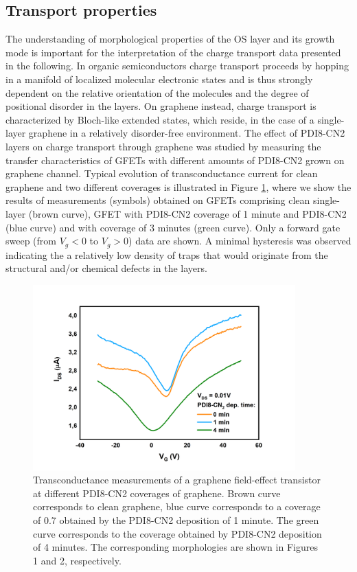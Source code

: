 \documentclass[preprint,aip,jap]{revtex4-2}
\begin{document}
 \subsection{Transport properties}
\label{sec:tran}


The understanding of morphological properties of the OS layer and its growth mode is important for the interpretation of the charge transport data presented in the following.
  In organic semiconductors charge transport proceeds by hopping in a manifold of localized molecular electronic states and is thus strongly dependent on the relative orientation of the molecules and the degree of positional disorder in the layers.
  On graphene instead, charge transport is characterized by Bloch-like extended states, which reside, in the case of a single-layer graphene in a relatively disorder-free environment.
  The effect of PDI8-CN2 layers on charge transport through graphene was studied by measuring the transfer characteristics of GFETs with different amounts of PDI8-CN2 grown on graphene channel.
 Typical evolution of transconductance current for clean graphene and two different coverages is illustrated in Figure \ref{fig:3}, where we show the results of measurements (symbols) obtained on GFETs comprising clean single-layer (brown curve), GFET with PDI8-CN2 coverage of 1 minute and PDI8-CN2 (blue curve) and with coverage of 3 minutes (green curve).
 Only a forward gate sweep (from $V_g<0$ to $V_g>0$) data are shown.
 A minimal hysteresis was observed  indicating the  a relatively low density of traps that would originate from the structural and/or chemical defects in the layers.



\begin{figure}[htb]
  \centering
   \includegraphics[width=0.9\textwidth]{./Figures/fig3}  
  \caption{Transconductance measurements of a graphene field-effect transistor at different PDI8-CN2 coverages of graphene.
 Brown curve corresponds to clean graphene, blue curve corresponds to a coverage of 0.7 obtained by the PDI8-CN2 deposition of 1 minute.
 The green curve corresponds to the coverage obtained by PDI8-CN2 deposition of 4 minutes.
 The corresponding morphologies are shown in Figures 1 and 2, respectively. 
 }
  \label{fig:3}
\end{figure}
\end{document}
